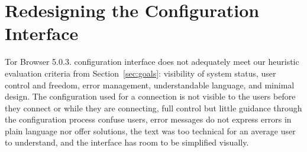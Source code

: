\documentclass[USenglish,oneside,twocolumn]{article}
\begin{document}

\section{Redesigning the Configuration Interface}


Tor Browser 5.0.3. configuration interface does not adequately meet our heuristic evaluation criteria from Section~\ref{sec:goals}: visibility of system status, user control and freedom, error management, understandable language, and minimal design. The configuration used for a connection is not visible to the users before they connect or while they are connecting, full control but little guidance through the configuration process confuse users, error messages do not express errors in plain language nor offer solutions, the text was too technical for an average user to understand, and the interface has room to be simplified visually.  
\end{document}
